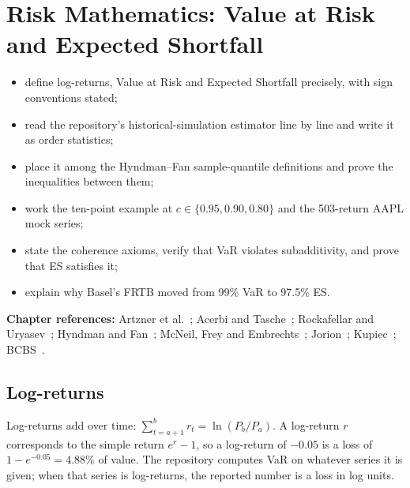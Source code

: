 \chapter{Risk Mathematics: Value at Risk and Expected Shortfall}\label{ch:risk}

\begin{objectives}
\begin{itemize}
\item define log-returns, Value at Risk and Expected Shortfall precisely, with sign conventions stated;
\item read the repository's historical-simulation estimator line by line and write it as order statistics;
\item place it among the Hyndman--Fan sample-quantile definitions and prove the inequalities between them;
\item work the ten-point example at $c\in\{0.95,0.90,0.80\}$ and the 503-return AAPL mock series;
\item state the coherence axioms, verify that VaR violates subadditivity, and prove that ES satisfies it;
\item explain why Basel's FRTB moved from 99\% VaR to 97.5\% ES.
\end{itemize}
{\small\color{muted}\textbf{Chapter references:} Artzner et al.~\cite{artzner1999coherent}; Acerbi and Tasche~\cite{acerbi2002coherence};
Rockafellar and Uryasev~\cite{rockafellar2000cvar,rockafellar2002general}; Hyndman and Fan~\cite{hyndman1996sample};
McNeil, Frey and Embrechts~\cite{mcneil2015qrm}; Jorion~\cite{jorion2007var}; Kupiec~\cite{kupiec1995techniques};
BCBS~\cite{bcbs1996amendment,bcbs2019frtb}.}
\end{objectives}

\section{Log-returns}
Log-returns add over time: $\sum_{t=a+1}^{b}r_t=\ln(P_b/P_a)$. A log-return $r$ corresponds to the simple return
$e^r-1$, so a log-return of $-0.05$ is a loss of $1-e^{-0.05}=4.88\%$ of value. The repository computes VaR on
whatever series it is given; when that series is log-returns, the reported number is a loss in log units.


